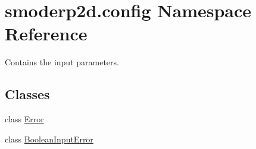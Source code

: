 \hypertarget{namespacesmoderp2d_1_1config}{\section{smoderp2d.\-config Namespace Reference}
\label{namespacesmoderp2d_1_1config}
}


Contains the input parameters.  


\subsection*{Classes}
\begin{DoxyCompactItemize}
\item 
class \hyperlink{classsmoderp2d_1_1config_1_1Error}{Error}
\item 
class \hyperlink{classsmoderp2d_1_1config_1_1BooleanInputError}{Boolean\-Input\-Error}
\end{DoxyCompactItemize}
